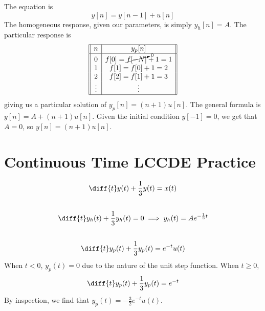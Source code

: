 \documentclass{article}
\begin{document}
The equation is
\begin{equation}
    y[n] = y[n - 1] + u[n]
\end{equation}
The homogeneous response, given our parameters, is simply \(y_h[n] = A\).
The particular response is
\begin{equation}
    \begin{array}[]{||c|c||}
        \hline
        n & y_p[n] \\
        \hline
        0 & f[0] = \cancelto{0}{f[-N]} + 1 = 1 \\
        1 & f[1] = f[0] + 1 = 2 \\
        2 & f[2] = f[1] + 1 = 3 \\
        \vdots & \vdots \\
        \hline
    \end{array}
\end{equation}
giving us a particular solution of \(y_p[n] = (n + 1) u[n]\).
The general formula is \(y[n] = A + (n + 1) u[n]\).
Given the initial condition \(y[-1] = 0\), we get that \(A = 0\), so \(y[n] = (n + 1) u[n]\).

\section{Continuous Time LCCDE Practice}

\begin{equation}
    \diff{t} y(t) + \frac{1}{3} y(t) = x(t)
\end{equation}

\subsection{}

\begin{equation}
    \diff{t} y_h(t) + \frac{1}{3} y_h(t) = 0 \implies y_h(t) = A e^{-\frac{1}{3} t}
\end{equation}

\subsection{}

\begin{equation}
    \diff{t} y_p(t) + \frac{1}{3} y_p(t) = e^{-t} u(t)
\end{equation}
When \(t < 0\), \(y_p(t) = 0\) due to the nature of the unit step function.
When \(t \geqslant 0\),
\begin{equation}
    \diff{t} y_p(t) + \frac{1}{3} y_p(t) = e^{-t}
\end{equation}
By inspection, we find that \(y_p(t) = -\frac{3}{2} e^{-t} u(t)\).
\end{document}
